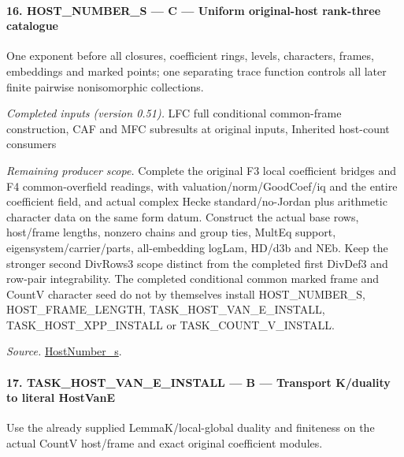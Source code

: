 \paragraph{16. HOST\_\allowbreak NUMBER\_\allowbreak S — C — Uniform original-host rank-three catalogue}

One exponent before all closures, coefficient rings, levels, characters, frames, embeddings and marked points; one separating trace function controls all later finite pairwise nonisomorphic collections.

\emph{Completed inputs (version 0.51).} LFC full conditional common-frame construction, CAF and MFC subresults at original inputs, Inherited host-count consumers

\emph{Remaining producer scope.} Complete the original F3 local coefficient bridges and F4 common-overfield readings, with valuation/norm/GoodCoef/iq and the entire coefficient field, and actual complex Hecke standard/no-Jordan plus arithmetic character data on the same form datum. Construct the actual base rows, host/frame lengths, nonzero chains and group ties, MultEq support, eigensystem/carrier/parts, all-embedding logLam, HD/d3b and NEb. Keep the stronger second DivRows3 scope distinct from the completed first DivDef3 and row-pair integrability. The completed conditional common marked frame and CountV character seed do not by themselves install HOST\_\allowbreak NUMBER\_\allowbreak S, HOST\_\allowbreak FRAME\_\allowbreak LENGTH, TASK\_\allowbreak HOST\_\allowbreak VAN\_\allowbreak E\_\allowbreak INSTALL, TASK\_\allowbreak HOST\_\allowbreak XPP\_\allowbreak INSTALL or TASK\_\allowbreak COUNT\_\allowbreak V\_\allowbreak INSTALL.

\emph{Source.} \href{https://github.com/CocoSgt/riemann-hypothesis-lean/blob/7cbf7a0c32fca1badf05931879a37c3f8a2b03b4/src/Development/AutomorphicArithmetic/AutomorphicVarieties/ModularityArgument/ThresholdArguments/DenseThresholdCases/HostNumberS.lean#L18-L28}{HostNumber\_\allowbreak s}.



\paragraph{17. TASK\_\allowbreak HOST\_\allowbreak VAN\_\allowbreak E\_\allowbreak INSTALL — B — Transport K/duality to literal HostVanE}

Use the already supplied LemmaK/local-global duality and finiteness on the actual CountV host/frame and exact original coefficient modules.

